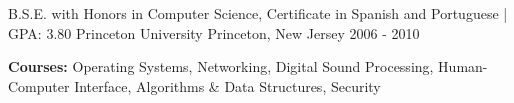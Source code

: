 

\begin{cventries}

  \cventry
    {B.S.E. with Honors in Computer Science, Certificate in Spanish and Portuguese | GPA: 3.80} %
    {Princeton University} %
    {Princeton, New Jersey} %
    {2006 - 2010} %
    {
		\vspace{-5.0mm}
		\item {\textbf{Courses:} Operating Systems, Networking, Digital Sound Processing, Human-Computer Interface, Algorithms \& Data Structures, Security}
	}

\end{cventries}
